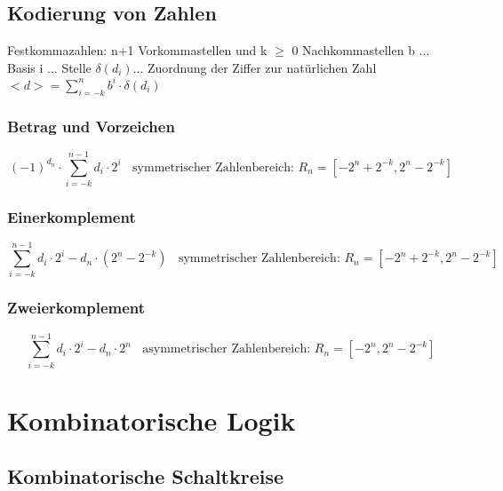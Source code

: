 \documentclass{scrartcl}[10pt]
\begin{document}
 \subsection{Kodierung von Zahlen}
 Festkommazahlen: n+1 Vorkommastellen und k $\geq$ 0 Nachkommastellen
 b ... Basis
 i ... Stelle
$\delta(d_i)$... Zuordnung der Ziffer zur nat\"urlichen Zahl\\
 $<d> = \sum_{i=-k}^{n}{b^i \cdot \delta(d_i)}$\\
 \subsubsection{Betrag und Vorzeichen}
\[(-1)^{d_n} \cdot \sum_{i=-k}^{n-1}{d_i \cdot 2^i} \ \ \ \ \text{symmetrischer Zahlenbereich: } R_n = [-2^n+2^{-k}, 2^n-2^{-k}]\]
\subsubsection{Einerkomplement}
\[\sum_{i=-k}^{n-1}{d_i \cdot 2^i}-d_n \cdot (2^n-2^{-k}) \ \ \ \ \text{symmetrischer Zahlenbereich: } R_n = [-2^n+2^{-k}, 2^n-2^{-k}]\]
\subsubsection{Zweierkomplement}
\[\sum_{i=-k}^{n-1}{d_i \cdot 2^i}-d_n \cdot 2^n \ \ \ \ \text{asymmetrischer Zahlenbereich: } R_n = [-2^n, 2^n-2^{-k}]\]
\newpage
\section{Kombinatorische Logik}
\subsection{Kombinatorische Schaltkreise}
\end{document}
